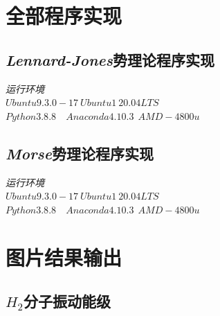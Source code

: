 \documentclass[11pt, a4paper, oneside]{ctexart}
\begin{document}
{{{\begin{thebibliography}{99}
\end{thebibliography}

\newpage

\begin{appendices}


    \renewcommand{\thesection}{\Alph{section}}
    \section{全部程序实现}


\subsection{\emph{Lennard-Jones}势理论程序实现}
{
    \begin{flushright}
        \scriptsize\emph{运行环境\\$Ubuntu 9.3.0-17\ Ubuntu1~20.04LTS$}\\
        \scriptsize\emph{$Python 3.8.8$\ \ $Anaconda 4.10.3\ \  AMD-4800u$}
            
        \end{flushright}

}
\subsection{\emph{Morse}势理论程序实现}
{
    \begin{flushright}
        \scriptsize\emph{运行环境\\$Ubuntu 9.3.0-17\ Ubuntu1~20.04LTS$}\\
        \scriptsize\emph{$Python 3.8.8$\ \ $Anaconda 4.10.3\ \  AMD-4800u$}
            
        \end{flushright}

}
    
\newpage
\renewcommand{\thesection}{\Alph{section}}
    \section{图片结果输出}

    \subsection{$H_2$分子振动能级}

\end{appendices}}}}
\end{document}
